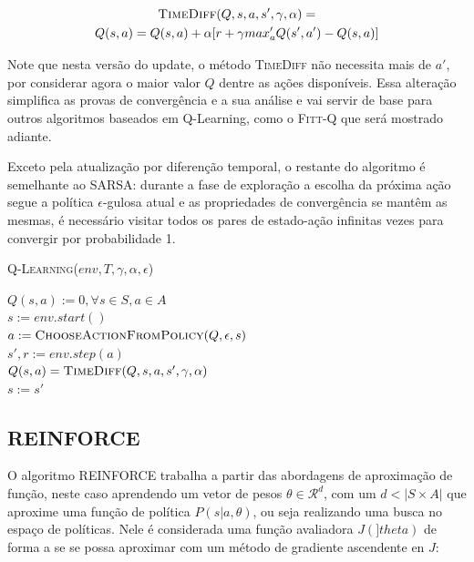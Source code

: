 \documentclass[letterpaper]{article}
\begin{document}
\begin{multline} \label{eq:time_diff_update_q_learning}
  \textsc{TimeDiff}(Q, s, a, s', \gamma, \alpha) = \\ 
      Q(s,a) = Q(s,a) + \alpha [r + \gamma max_a' Q(s', a') - Q(s,a)]
\end{multline}

Note que nesta versão do update, o método \textsc{TimeDiff} não necessita mais de $a'$, por considerar agora o maior valor $Q$ dentre as ações disponíveis. Essa alteração simplifica as provas de convergência e a sua análise e vai servir de base para outros algoritmos baseados em Q-Learning, como o \textsc{Fitt-Q} que será mostrado adiante.

Exceto pela atualização por diferenção temporal, o restante do algoritmo é semelhante ao \textsc{SARSA}: durante a fase de exploração a escolha da próxima ação segue a política $\epsilon$-gulosa atual e as propriedades de convergência se mantêm as mesmas, é necessário visitar todos os pares de estado-ação infinitas vezes para convergir por probabilidade 1.

\linesnumbered
\dontprintsemicolon
\begin{algorithm}[t!]
{
	\caption{\textsc{Q-Learning}($ env, T, \gamma, \alpha, \epsilon $)}
	\label{alg:q-learning}
    $Q(s,a) := 0, \forall s \in S, a \in A $\\

    {
      $s := env.start()$\\

      {
        $a := \textsc{ChooseActionFromPolicy}(Q, \epsilon, s) $\\
        $s', r := env.step(a)$\\
        $Q(s, a) = \textsc{TimeDiff}(Q, s, a, s', \gamma, \alpha)$\\
        $s := s'$ \\
      }
    }

}
\end{algorithm}

\subsection{REINFORCE}

O algoritmo \textsc{REINFORCE} trabalha a partir das abordagens de aproximação de função, neste caso aprendendo um vetor de pesos $\theta \in \mathcal{R}^d$, com um $d < |S \times A|$ que aproxime uma função de política $P(s|a, \theta)$, ou seja realizando uma busca no espaço de políticas. Nele é considerada uma função avaliadora $J(]theta)$ de forma a se se possa aproximar com um método de gradiente ascendente en $J$:
\end{document}
